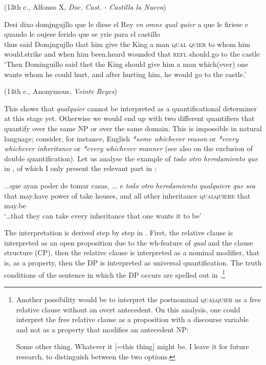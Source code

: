 (13th c., Alfonso X, \textit{Doc. Cast. - Castilla la Nueva})
    
\ex{} \gll […] Desi dixo domjngujllo que le diese el Rey \textit{vn} \textit{omne} \textit{qual} \textit{quier} a que le firiese e quando le oujese ferido que se yrie para el castillo\\
{} thus said Domjngujllo that him give the King a man \textsc{qual} \textsc{quier} to whom him would.strike and when him been.heard wounded that \textsc{refl} should.go to the castle\\
    \glt ‘Then Dominguillo said thet the King should give him a man which(ever) one wants whom he could hurt, and after hurting him, he would go to the castle.’

    (14th c., Anonymous, \textit{Veinte Reyes})
\z
\z

This shows that \textit{qualquier} cannot be interpreted as a quantificational determiner at this stage yet. Otherwise we would end up with two different quantifiers that quantify over the same NP or over the same domain. This is impossible in natural language; consider, for instance, English \textit{*some whichever reason} or \textit{*every whichever inheritance} or \textit{*every whichever manner} (see also  on the exclusion of double quantification). Let us analyse the example of \textit{todo otro heredamiento que} in , of which I only present the relevant part in :

\ea \label{ex:key:318} %
  \gll ...que ayan poder de tomar casas, ... e \textit{todo} \textit{otro} \textit{heredamiento} \textit{qualquiere} \textit{que} \textit{sea}\\
that may.have power of take houses, {} and all other inheritance \textsc{qualquiere} that may.be\\
  \glt ‘…that they can take every inheritance that one wants it to be’
\z

The interpretation is derived step by step in . First, the relative clause is interpreted as an open proposition due to the wh-feature of \textit{qual} and the clause structure (CP), then the relative clause is interpreted as a nominal modifier, that is, as a property, then the DP is interpreted as universal quantification. The truth conditions of the sentence in which the DP occurs are spelled out in .\footnote{{Another
      possibility would be to interpret the postnominal} {\textsc{qualquier}} {as a free relative clause without an overt antecedent. On this analysis, one could interpret the free relative clause as a proposition with a discourse variable and not as a property that modifies an antecedent NP:}

      \ea
        {Some other thing. Whatever it [=this thing] might be.}
      \z
      {I leave it for future research, to distinguish between the two options.}

}

